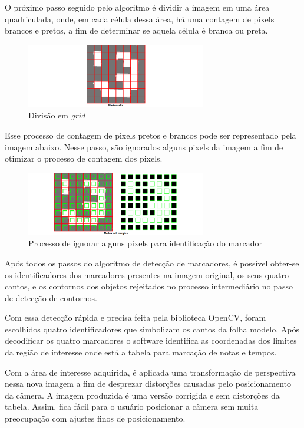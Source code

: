 \documentclass[12pt]{report}
\begin{document}
O próximo passo seguido pelo algoritmo é dividir a imagem em uma área
quadriculada, onde, em cada célula dessa área, há uma contagem de
pixels brancos e pretos, a fim de determinar se aquela célula é branca
ou preta.

\begin{figure}[H]
  \centering
    \includegraphics[width=0.7\textwidth]{imagens/bits2.png}
    \caption{Divisão em {\it grid}}
  \label{fig:bits2}
\end{figure}

Esse processo de contagem de pixels pretos e brancos pode ser
representado pela imagem abaixo. Nesse passo, são ignorados alguns
pixels da imagem a fim de otimizar o processo de contagem dos pixels.

\begin{figure}[H]
  \centering
    \includegraphics[width=0.7\textwidth]{imagens/bits3.png}
    \caption{Processo de ignorar alguns pixels para identificação do marcador}
  \label{fig:bits3}
\end{figure}

Após todos os passos do algoritmo de detecção de marcadores, é
possível obter-se os identificadores dos marcadores presentes na
imagem original, os seus quatro cantos, e os contornos dos objetos
rejeitados no processo intermediário no passo de detecção de contornos.

Com essa detecção rápida e precisa feita pela biblioteca OpenCV, foram
escolhidos quatro identificadores que simbolizam os cantos da folha
modelo. Após decodificar os quatro marcadores o software identifica as
coordenadas dos limites da região de interesse onde está a tabela para
marcação de notas e tempos.

Com a área de interesse adquirida, é aplicada uma transformação de
perspectiva nessa nova imagem a fim de desprezar distorções causadas
pelo posicionamento da câmera. A imagem produzida é uma versão
corrigida e sem distorções da tabela. Assim, fica fácil para o usuário
posicionar a câmera sem muita preocupação com ajustes finos de
posicionamento. 
\end{document}
